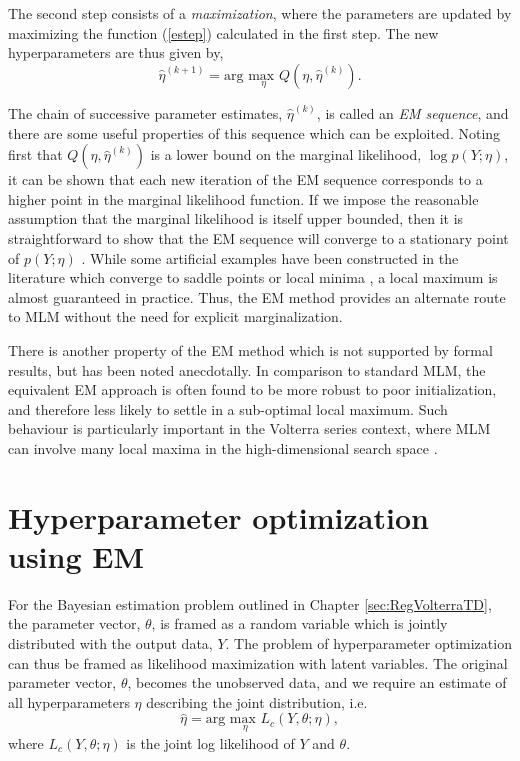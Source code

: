 The second step consists of a \emph{maximization}, where the parameters are updated by maximizing the function (\ref{estep}) calculated in the first step. The new hyperparameters are thus given by,
\begin{equation}
\hat{\eta}^{(k+1)} = \text{arg } \underset{\eta}{\text{max }} Q(\eta,\hat{\eta}^{(k)}).
\end{equation}

The chain of successive parameter estimates, $\hat{\eta}^{(k)}$, is called an \emph{EM sequence}, and there are some useful properties of this sequence which can be exploited. Noting first that $Q(\eta,\hat{\eta}^{(k)})$ is a lower bound on the marginal likelihood, $\log p(Y; \eta)$, it can be shown that each new iteration of the EM sequence corresponds to a higher point in the marginal likelihood function. If we impose the reasonable assumption that the marginal likelihood is itself upper bounded, then it is straightforward to show that the EM sequence will converge to a stationary point of $p(Y; \eta)$ \cite{Wu1983}. While some artificial examples have been constructed in the literature which converge to saddle points or local minima \cite{McLachlan2007}, a local maximum is almost guaranteed in practice. Thus, the EM method provides an alternate route to MLM without the need for explicit marginalization.

There is another property of the EM method which is not supported by formal results, but has been noted anecdotally. In comparison to standard MLM, the equivalent EM approach is often found to be more robust to poor initialization, and therefore less likely to settle in a sub-optimal local maximum. Such behaviour is particularly important in the Volterra series context, where MLM can involve many local maxima in the high-dimensional search space \cite{Birpoutsoukis2017}.

\section{Hyperparameter optimization using EM}

For the Bayesian estimation problem outlined in Chapter \ref{sec:RegVolterraTD}, the parameter vector, $\theta$, is framed as a random variable which is jointly distributed with the output data, $Y$. The problem of hyperparameter optimization can thus be framed as likelihood maximization with latent variables. The original parameter vector, $\theta$, becomes the unobserved data, and we require an estimate of all hyperparameters $\eta$ describing the joint distribution, i.e. 
\begin{equation}
\hat{\eta} = \text{arg } \underset{\eta}{\text{max }} L_c(Y,\theta;\eta),
\end{equation}
where $ L_c(Y,\theta;\eta)$ is the joint log likelihood of $Y$ and $\theta$.

